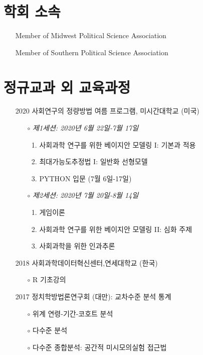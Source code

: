 \documentclass[11pt]{res} %
\begin{document}
\begin{resume}
\section{학회 소속} 
 \begin{itemize}[wide = 0pt] \itemsep -2pt 
 	\item[ ] Member of Midwest Political Science Association
 	\item[ ] Member of Southern Political Science Association
\end{itemize}

\section{정규교과 외 교육과정} 
\begin{itemize}[wide = 0pt] \itemsep -2pt 
	\item[2020] 사회연구의 정량방법 여름 프로그램, 미시간대학교 (미국)
	\begin{itemize}
		\item[$\circ$] \textit{제1세션: 2020년 6월 22일-7월 17일}
		\begin{enumerate}
			\item 사회과학 연구를 위한 베이지안 모델링 I: 기본과 적용
			\item 최대가능도추정법 I: 일반화 선형모델
			\item PYTHON 입문 (7월 6일-17일)
		\end{enumerate}
		\item[$\circ$] \textit{제2세션: 2020년 7월 20일-8월 14일}
		\begin{enumerate}
			\item 게임이론
			\item 사회과학 연구를 위한 베이지안 모델링 II: 심화 주제
			\item 사회과학을 위한 인과추론
		\end{enumerate}
	\end{itemize}
	\item[2018] 사회과학데이터혁신센터,연세대학교 (한국)
	\begin{itemize}
	\item[$\circ$] R 기초강의
	\end{itemize}
	\item[2017] 정치학방법론연구회 (대만): 교차수준 분석 통계
	\begin{itemize} \itemsep -2pt 
		\item[$\circ$] 위계 연령-기간-코호트 분석
		\item[$\circ$] 다수준 분석
		\item[$\circ$] 다수준 종합분석: 공간적 미시모의실험 접근법

\end{itemize}
\end{itemize}
\end{resume}
\end{document}
